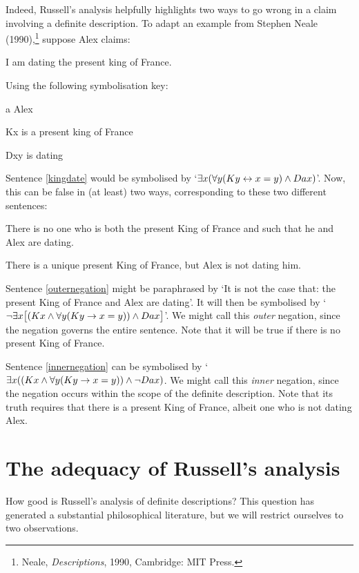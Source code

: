 Indeed, Russell's analysis helpfully highlights two ways to go wrong in a claim involving a definite description. To adapt an example from Stephen Neale (1990),\footnote{Neale, \emph{Descriptions}, 1990, Cambridge: MIT Press.}  suppose Alex claims:
	\begin{earg}
		\item[\ex{kingdate}] I am dating the present king of France.
	\end{earg}
Using the following symbolisation key:
	\begin{ekey}
		\item[a] Alex
		\item[Kx]  is a present king of France
		\item[Dxy]  is dating 
	\end{ekey}
Sentence \ref{kingdate} would be symbolised by `$\exists x (\forall y(Ky \leftrightarrow  x = y) \wedge Dax)$'. Now, this can be false in (at least) two ways, corresponding to these two different sentences:
	\begin{earg}
		\item[\ex{outernegation}] There is no one who is both the present King of France and  such that he and Alex are dating.
		\item[\ex{innernegation}] There is a unique present King of France, but Alex is not dating him.
	\end{earg}
Sentence \ref{outernegation} might be paraphrased by `It is not the case that: the present King of France and Alex are dating'. It will then be symbolised by `$\neg \exists x\bigl[(Kx \wedge \forall y(Ky \rightarrow  x = y)) \wedge Dax \bigr]$'. We might call this \emph{outer} negation, since the negation governs the entire sentence. Note that it will be true if there is no present King of France.

Sentence \ref{innernegation} can be symbolised by `$\exists x ((Kx \wedge \forall y(Ky \rightarrow x = y)) \wedge \neg Dax)$. We might call this \emph{inner} negation, since the negation occurs within the scope of the definite description. Note that its truth requires that there is a present King of France, albeit one who is not dating Alex.


\section{The adequacy of Russell's analysis}
How good is Russell's analysis of definite descriptions? This question has generated a substantial philosophical literature, but we will restrict ourselves to two observations.

